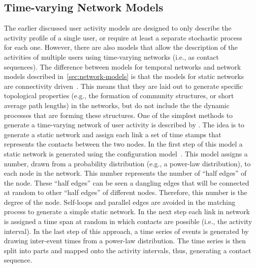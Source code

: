 \subsection{Time-varying Network Models}
\label{subsec:time-varying-network-models}

The earlier discussed user activity models are designed to only describe the activity profile of a single user, or require at least a separate stochastic process for each one.
However, there are also models that allow the description of the activities of multiple users using time-varying networks (i.e., as contact sequences).
The difference between models for temporal networks and network models described in~\autoref{sec:network-models} is that the models for static networks are connectivity driven~\cite{Perra2012a}.
This means that they are laid out to generate specific topological properties (e.g., the formation of community structures, or short average path lengths) in the networks, but do not include the the dynamic processes that are forming these structures.
One of the simplest methods to generate a time-varying network of user activity is described by \citet{Holme2013}.
The idea is to generate a static network and assign each link a set of time stamps that represents the contacts between the two nodes.
In the first step of this model a static network is generated using the configuration model~\cite[cf. sec. 13.2]{Newman2010}.
This model assigns a number, drawn from a probability distribution (e.g., a power-law distribution), to each node in the network.
This number represents the number of \enquote{half edges} of the node.
These \enquote{half edges} can be seen a dangling edges that will be connected at random to other \enquote{half edges} of different nodes.
Therefore, this number is the degree of the node.
Self-loops and parallel edges are avoided in the matching process to generate a simple static network.
In the next step each link in network is assigned a time span at random in which contacts are possible (i.e., the activity interval).
In the last step of this approach, a time series of events is generated by drawing inter-event times from a power-law distribution.
The time series is then split into parts and mapped onto the activity intervals, thus, generating a contact sequence.

